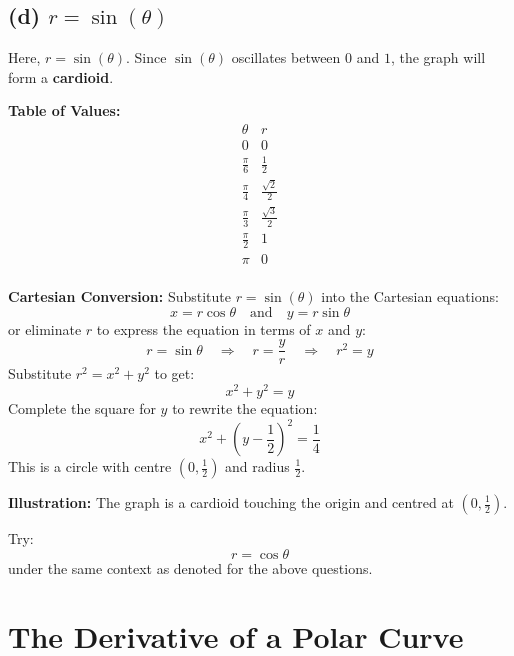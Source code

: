 \documentclass{article}
\begin{document}
\subsection*{(d) \( r = \sin(\theta) \)}
\begin{solutionbox}
Here, \( r = \sin(\theta) \). Since \( \sin(\theta) \) oscillates between \( 0 \) and \( 1 \), the graph will form a \textbf{cardioid}.

\textbf{Table of Values:}
\[
\begin{array}{c|c}
\theta & r \\
\hline
0 & 0 \\
\frac{\pi}{6} & \frac{1}{2} \\
\frac{\pi}{4} & \frac{\sqrt{2}}{2} \\
\frac{\pi}{3} & \frac{\sqrt{3}}{2} \\
\frac{\pi}{2} & 1 \\
\pi & 0 \\
\end{array}
\]

\textbf{Cartesian Conversion:}
Substitute \( r = \sin(\theta) \) into the Cartesian equations:
\[
x = r \cos\theta \quad \text{and} \quad y = r \sin\theta
\]
or eliminate \( r \) to express the equation in terms of \( x \) and \( y \):
\[
r = \sin\theta \quad \Rightarrow \quad r = \frac{y}{r} \quad \Rightarrow \quad r^2 = y
\]
Substitute \( r^2 = x^2 + y^2 \) to get:
\[
x^2 + y^2 = y
\]
Complete the square for \( y \) to rewrite the equation:
\[
x^2 + \left(y - \frac{1}{2}\right)^2 = \frac{1}{4}
\]
This is a circle with centre \( \left(0, \frac{1}{2}\right) \) and radius \( \frac{1}{2} \).

\textbf{Illustration:}
The graph is a cardioid touching the origin and centred at \( \left(0, \frac{1}{2}\right) \).
\end{solutionbox}

\begin{exercisebox}
Try:
\[
    r = \cos\theta
\]
under the same context as denoted for the above questions.
\end{exercisebox}

\section*{The Derivative of a Polar Curve}
\end{document}
